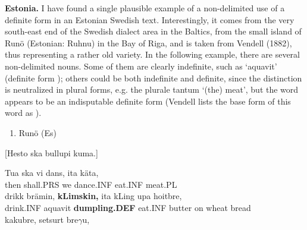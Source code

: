 \textbf{Estonia.} I have found a single plausible example of a non-delimited use of a definite form in an Estonian Swedish text. Interestingly, it comes from the very south-east end of the Swedish dialect area in the Baltics, from the small island of Runö (Estonian: Ruhnu) in the Bay of Riga, and is taken from Vendell (1882), thus representing a rather old variety. In the following example, there are several non-delimited nouns. Some of them are clearly indefinite, such as  ‘aquavit’ (definite form ); others could be both indefinite and definite, since the distinction is neutralized in plural forms, e.g. the plurale tantum  ‘(the) meat’, but the word  appears to be an indisputable definite form (Vendell lists the base form of this word as ).

\begin{enumerate} %
\item 
\label{bkm:Ref136427219}Runö (Es)

\end{enumerate} %
[Hesto ska bullupi kuma.] 


\ea\label{}
\gll Tua  ska  vi  dans,  ita  käta,\\


then   shall.PRS  we  dance.INF  eat.INF  meat.PL\\ %


\ea\label{}
\gll drikk  brämin,  \textbf{kLimskin,} ita  kLing  upa  hoitbre,\\


drink.INF  aquavit  \textbf{dumpling.DEF  } eat.INF  butter  on  wheat bread\\ %


\ea\label{}
\gll kakubre,  setsurt  bre$\gamma $u,\\


